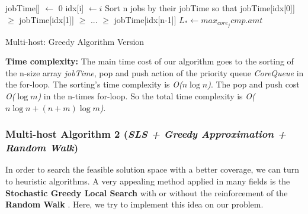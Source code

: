 \documentclass{article}
\begin{document}
        \begin{center}
        \begin{minipage}{15cm}
        \begin{algorithm}[H]
            \SetAlgoLined
            jobTime[] $\leftarrow$ 0 \; 
            idx[i] $\leftarrow i$\; 
	  {
            }
            Sort n jobs by their jobTime so that jobTime[idx[0]] $\geq$ jobTime[idx[1]] $\geq$ ... $\geq$ jobTime[idx[n-1]]\; 
            $L_* \leftarrow max_{core_j} cmp.amt$\;
            

        \caption{Multi-host: Greedy Algorithm Version}
        \end{algorithm}
        \end{minipage} 
        \end{center}
    
    \textbf{Time complexity:} The main time cost of our algorithm goes to the sorting of the n-size array \textit{jobTime}, pop and push action of the priority queue \textit{CoreQueue} in the for-loop. The sorting's time complexity is \textit{O($n \log n$)}. The pop and push cost \textit{O($\log m$)} in the n-times for-loop. So the total time complexity is  \textit{O($n \log n + (n + m)\log m$)}.\\
    
    \subsubsection{Multi-host Algorithm 2 (\textit{SLS + Greedy Approximation + Random Walk})}  
    In order to search the feasible solution space with a better coverage, we can turn to heuristic algorithms. A very appealing method applied in many fields is the \textbf{Stochastic Greedy Local Search} with or without the reinforcement of the \textbf{Random Walk} \cite{DECHTER2003191}. Here, we try to implement this idea on our problem.
    
\end{document}
